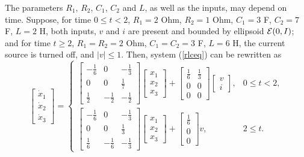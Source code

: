 The parameters $R_1$, $R_2$, $C_1$, $C_2$ and $L$, as well as the inputs,
may depend on time. Suppose, for time $0\leq t<2$, $R_1=2$ Ohm, $R_2=1$ Ohm,
$C_1=3$ F, $C_2=7$ F, $L=2$ H, both inputs, $v$ and $i$ are present and
bounded by ellipsoid $\EE(0,I)$; and for time $t\geq 2$,
$R_1=R_2=2$ Ohm, $C_1=C_2=3$ F, $L=6$ H, the current source is turned off,
and $|v|\leq 1$. Then, system (\ref{rlceq}) can be rewritten as
\begin{equation}
\left[\begin{array}{c}
\dot{x}_1\\
\dot{x}_2\\
\dot{x}_3\end{array}\right] = \left\{\begin{array}{ll}
\left[\begin{array}{ccc}
-\frac{1}{6} & 0 & -\frac{1}{3}\\
0 & 0 & \frac{1}{7}\\
\frac{1}{2} & -\frac{1}{2} & -\frac{1}{2}\end{array}\right]
\left[\begin{array}{c}
x_1\\
x_2\\
x_3\end{array}\right] + \left[\begin{array}{cc}
\frac{1}{6} & \frac{1}{3}\\
0 & 0\\
0 & 0\end{array}\right]\left[\begin{array}{c}
v\\
i\end{array}\right], & 0\leq t< 2, \\
\left[\begin{array}{ccc}
-\frac{1}{6} & 0 & -\frac{1}{3}\\
0 & 0 & \frac{1}{3}\\
\frac{1}{6} & -\frac{1}{6} & -\frac{1}{3}\end{array}\right]
\left[\begin{array}{c}
x_1\\
x_2\\
x_3\end{array}\right] + \left[\begin{array}{c}
\frac{1}{6} \\
0 \\
0 \end{array}\right]v, & 2\leq t. \end{array}\right.
\label{rlceq2}
\end{equation}
